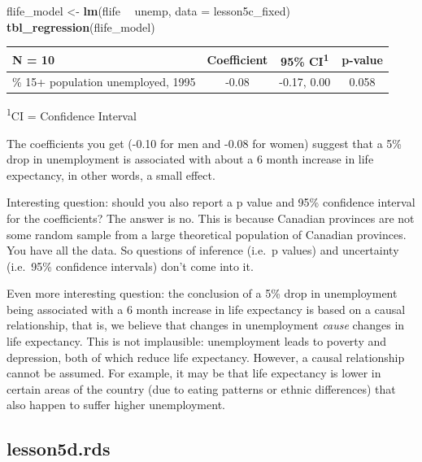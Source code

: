 \documentclass[]{book}
\newenvironment{Shaded}{\begin{snugshade}}{\end{snugshade}}
\newcommand{\DataTypeTok}[1]{\textcolor[rgb]{0.13,0.29,0.53}{#1}}
\newcommand{\KeywordTok}[1]{\textcolor[rgb]{0.13,0.29,0.53}{\textbf{#1}}}
\newcommand{\NormalTok}[1]{#1}
\newcommand{\OperatorTok}[1]{\textcolor[rgb]{0.81,0.36,0.00}{\textbf{#1}}}
\newcommand{\StringTok}[1]{\textcolor[rgb]{0.31,0.60,0.02}{#1}}
\begin{document}
\begin{Shaded}
\begin{Highlighting}[]
\NormalTok{flife_model <-}\StringTok{ }\KeywordTok{lm}\NormalTok{(flife }\OperatorTok{~}\StringTok{ }\NormalTok{unemp, }\DataTypeTok{data =}\NormalTok{ lesson5c_fixed)}
\KeywordTok{tbl_regression}\NormalTok{(flife_model)}
\end{Highlighting}
\end{Shaded}

\captionsetup[table]{labelformat=empty,skip=1pt}
\begin{longtable}{lccc}
\toprule
\textbf{N = 10} & \textbf{Coefficient} & \textbf{95\% CI}\textsuperscript{1} & \textbf{p-value} \\ 
\midrule
\% 15+ population unemployed, 1995 & -0.08 & -0.17, 0.00 & 0.058 \\ 
\bottomrule
\end{longtable}
\vspace{-5mm}
\begin{minipage}{\linewidth}
\textsuperscript{1}CI = Confidence Interval \\ 
\end{minipage}

The coefficients you get (-0.10 for men and -0.08 for women) suggest that a 5\% drop in unemployment is associated with about a 6 month increase in life expectancy, in other words, a small effect.

Interesting question: should you also report a p value and 95\% confidence interval for the coefficients? The answer is no. This is because Canadian provinces are not some random sample from a large theoretical population of Canadian provinces. You have all the data. So questions of inference (i.e.~p values) and uncertainty (i.e.~95\% confidence intervals) don't come into it.

Even more interesting question: the conclusion of a 5\% drop in unemployment being associated with a 6 month increase in life expectancy is based on a causal relationship, that is, we believe that changes in unemployment \emph{cause} changes in life expectancy. This is not implausible: unemployment leads to poverty and depression, both of which reduce life expectancy. However, a causal relationship cannot be assumed. For example, it may be that life expectancy is lower in certain areas of the country (due to eating patterns or ethnic differences) that also happen to suffer higher unemployment.

\hypertarget{lesson5d.rds}{%
\subsection{lesson5d.rds}\label{lesson5d.rds}}
\end{document}
